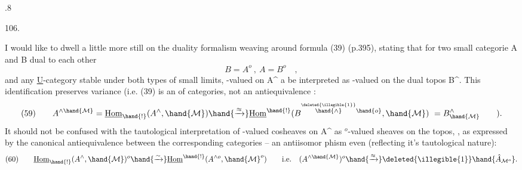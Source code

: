 
.8

106. 

I would like to dwell a little more still on the duality formalism
weaving around formula (39) (p.395), stating that for two  small categorie
A and B dual to each other
\[ B=A^{o} \ , \ A=B^{o} \quad , \]
and any \underline{U}-category  stable under both types of small limits, -valued
\hand{\uline{\textcolor{black}{cosheaves}}} on A\^{} a be interpreted as -valued \hand{\uline{\textcolor{black}{sheaves}}} on the dual topos
B\^{}. This identification preserves variance (i.e. (39) is an \hand{\uline{\textcolor{black}{equivalence}}}
of categories, not an antiequivalence :
\[ (59) \qquad A^{\wedge\hand{\mathcal{M}}} = \underline{\mathrm{Hom}}_{\hand{!}}(A^{\wedge},\hand{\mathcal{M}}) \hand{\xrightarrow{\approx}} \underline{\mathrm{Hom}}^{\hand{!}}(B^{\overset{\deleted{\illegible{1}}}{\hand{\wedge}}\hand{o}},\hand{\mathcal{M}}) \ = B^{\wedge}_{\hand{\mathcal{M}}} \qquad ). \]
It should not be confused with the tautological interpretation of
-valued cosheaves on A\^{} as $^{o}$-valued sheaves on the \hand{\uline{\textcolor{black}{same}}} topos,  
 \hand{\uline{\textcolor{black}{reversing}}} \hand{\uline{\textcolor{black}{variance}}}, as expressed by the canonical  
antiequivalence between the corresponding categories -- an antiisomor
phism even (reflecting it's tautological nature):
\[ (60) \qquad \underline{\mathrm{Hom}}_{\hand{!}}(A^{\wedge},\hand{\mathcal{M}})^{o} \hand{\xrightarrow{\sim}} \underline{\mathrm{Hom}}^{\hand{!}}(A^{\wedge o},\hand{\mathcal{M}}^{o}) \qquad \text{i.e.} \quad (A^{\wedge\hand{\mathcal{M}}})^{o} \hand{\xrightarrow{\approx}} \deleted{\illegible{1}} \hand{\hat{A}_{\mathcal{M}^{o}}}. \]
